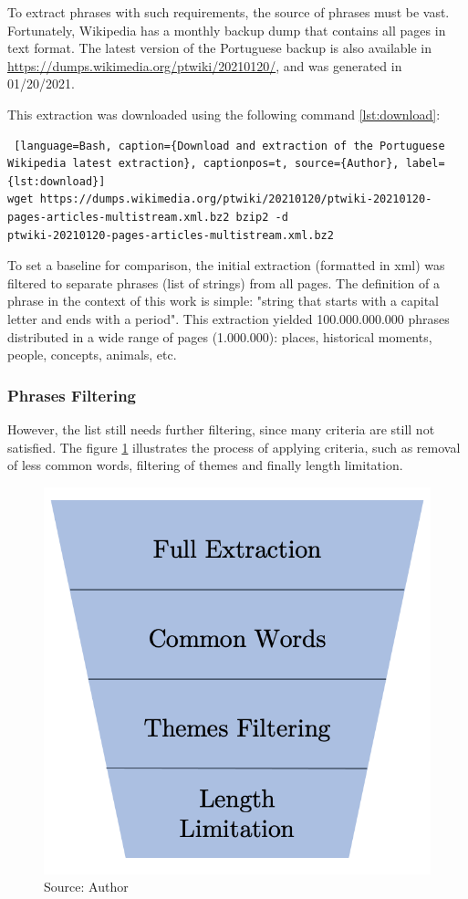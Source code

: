 To extract phrases with such requirements, the source of phrases must be vast. Fortunately, Wikipedia has a monthly backup dump that contains all pages in text format. The latest version of the Portuguese backup is also available in \url{https://dumps.wikimedia.org/ptwiki/20210120/}, and was generated in 01/20/2021.

This extraction was downloaded using the following command \ref{lst:download}:

\begin{lstlisting} [language=Bash, caption={Download and extraction of the Portuguese Wikipedia latest extraction}, captionpos=t, source={Author}, label={lst:download}]
wget https://dumps.wikimedia.org/ptwiki/20210120/ptwiki-20210120-pages-articles-multistream.xml.bz2 bzip2 -d
ptwiki-20210120-pages-articles-multistream.xml.bz2
\end{lstlisting}

To set a baseline for comparison, the initial extraction (formatted in xml) was filtered to separate phrases (list of strings) from all pages. The definition of a phrase in the context of this work is simple: "string that starts with a capital letter and ends with a period". This extraction yielded 100.000.000.000 phrases distributed in a wide range of pages (1.000.000): places, historical moments, people, concepts, animals, etc.

\subsubsection{Phrases Filtering}

However, the list still needs further filtering, since many criteria are still not satisfied. The figure \ref{fig:phrase-selection-pyramid} illustrates the process of applying criteria, such as removal of less common words, filtering of themes and finally length limitation.

\begin{figure}[h]
    \centering
    \caption{Filtering process for obtaining phrases for the Fale Alguma Coisa WebApp}
    \includegraphics[width=0.5\linewidth]{images/phrase-selection/filtering-pyramid.png}
    \caption*{Source: Author}
    \label{fig:phrase-selection-pyramid}
\end{figure}

